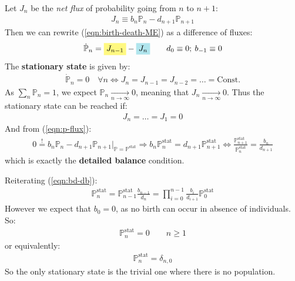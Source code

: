 \documentclass[../../main.tex]{subfiles}
\begin{document}
Let $J_n$ be the \textit{net flux} of probability going from $n$ to $n+1$:
\begin{align}\label{eqn:p-flux}
    J_n \equiv b_n \mathbb{P}_n - d_{n+1} \mathbb{P}_{n+1}
\end{align} 
Then we can rewrite (\ref{eqn:birth-death-ME}) as a difference of fluxes:
\begin{align*}
    \dot{\mathbb{P}}_n = \hlc{Yellow}{J_{n-1}} - \hlc{SkyBlue}{J_n} \qquad d_0 \equiv 0; \> b_{-1} \equiv 0
\end{align*}
The \textbf{stationary state} is given by:
\begin{align*}
    \dot{\mathbb{P}}_n = 0 \quad \forall n\Leftrightarrow J_n = J_{n-1} = J_{n-2} = \dots = \text{Const.}
\end{align*} 
As $\sum_n \mathbb{P}_n = 1$, we expect $\mathbb{P}_n  \xrightarrow[n \to \infty]{} 0$, meaning that $J_n  \xrightarrow[n \to \infty]{} 0$. Thus the stationary state can be reached if:
\begin{align*}
    J_n = \dots = J_1 = 0
\end{align*}
And from (\ref{eqn:p-flux}):
\begin{align}\label{eqn:bd-db}
    0 \overset{!}{=} b_{n} \mathbb{P}_n - d_{n+1} \mathbb{P}_{n+1} \Big|_{\mathbb{P} = \mathbb{P}^{\mathrm{stat}}} \Rightarrow b_n \mathbb{P}_{n}^{\mathrm{stat}} = d_{n+1} \mathbb{P}_{n+1}^{\mathrm{stat}} \Leftrightarrow \frac{\mathbb{P}_{n+1}^{\mathrm{stat}}}{\mathbb{P}_n^{\mathrm{stat}}}  = \frac{b_n}{d_{n+1}} 
\end{align}
which is exactly the \textbf{detailed balance} condition. 

\medskip

Reiterating (\ref{eqn:bd-db}):
\begin{align}\label{eqn:p-stat}
    \mathbb{P}_{n}^{\mathrm{stat}} = \mathbb{P}_{n-1}^{\mathrm{stat}} \frac{b_{n-1}}{d_n} = \prod_{i=0}^{n-1} \frac{b_i}{d_{i+1}}   \mathbb{P}_0^{\mathrm{stat}}
\end{align}
However we expect that $b_0 = 0$, as no birth can occur in absence of individuals. So:
\begin{align*}
    \mathbb{P}_{n}^{\mathrm{stat}} = 0 \qquad n \geq 1
\end{align*}
or equivalently:
\begin{align*}
    \mathbb{P}_{n}^{\mathrm{stat}} = \delta_{n,0}
\end{align*}
So the only stationary state is the trivial one where there is no population.
\end{document}

